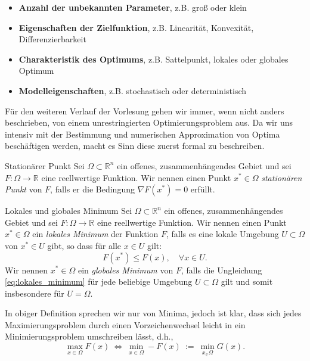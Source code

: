 \begin{itemize}
\item \textbf{Anzahl der unbekannten Parameter}, z.B. groß oder klein
\item \textbf{Eigenschaften der Zielfunktion}, z.B. Linearität, Konvexität, Differenzierbarkeit
\item \textbf{Charakteristik des Optimums}, z.B. Sattelpunkt, lokales oder globales Optimum
\item \textbf{Modelleigenschaften}, z.B. stochastisch oder deterministisch
\end{itemize}
Für den weiteren Verlauf der Vorlesung gehen wir immer, wenn nicht anders beschrieben, von einem unrestringierten Optimierungsproblem aus.
Da wir uns intensiv mit der Bestimmung und numerischen Approximation von Optima beschäftigen werden, macht es Sinn diese zuerst formal zu beschreiben.
\begin{definition}{Stationärer Punkt}{}
Sei $\Omega \subset \mathbb{R}^n$ ein offenes, zusammenhängendes Gebiet und sei $F \colon \Omega \rightarrow \mathbb{R}$ eine reellwertige Funktion. 
Wir nennen einen Punkt $x^* \in \Omega$ \emph{stationären Punkt} von $F$, falls er die Bedingung $\nabla F(x^*) = 0$ erfüllt.
\end{definition}
\begin{definition}{Lokales und globales Minimum}{}
Sei $\Omega \subset \mathbb{R}^n$ ein offenes, zusammenhängendes Gebiet und sei $F \colon \Omega \rightarrow \mathbb{R}$ eine reellwertige Funktion. 
Wir nennen einen Punkt $x^* \in \Omega$ ein \emph{lokales Minimum} der Funktion $F$, falls es eine lokale Umgebung $U \subset \Omega$ von $x^* \in U$ gibt, so dass für alle $x \in U$ gilt:
\begin{equation}
\label{eq:lokales_minimum}
F(x^*) \leq F(x), \quad \forall x \in U.
\end{equation}
Wir nennen $x^* \in \Omega$ ein \emph{globales Minimum} von $F$, falls die Ungleichung \eqref{eq:lokales_minimum} für jede beliebige Umgebung $U \subset \Omega$ gilt und somit insbesondere für $U = \Omega$. 
\end{definition}
\begin{remark}{}{}
In obiger Definition sprechen wir nur von Minima, jedoch ist klar, dass sich jedes Maximierungsproblem durch einen Vorzeichenwechsel leicht in ein Minimierungsproblem umschreiben lässt, d.h.,
\begin{equation*}
\max_{x\in\Omega} F(x) \ \Leftrightarrow \ \min_{x\in\Omega} -F(x) \ := \ \min_{x_\in\Omega} G(x).
\end{equation*}
\end{remark}
